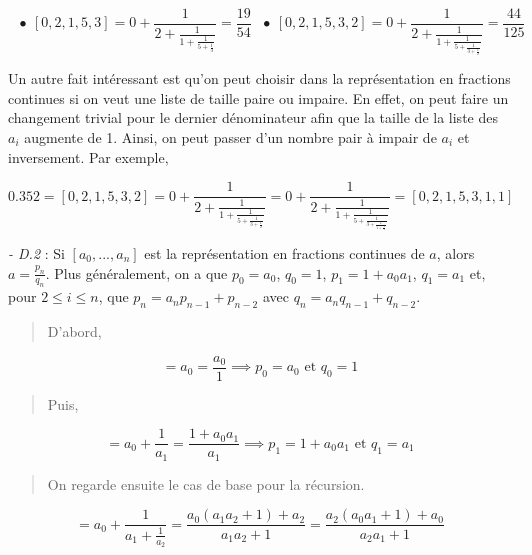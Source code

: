 \begin{equation*}
    \ \ \ \bullet \ [0,2,1,5,3] = 0 + \frac{1}{2 + \frac{1}{1 + \frac{1}{5 + \frac{1}{3}}}} = \frac{19}{54}\ \ \ \bullet \ [0,2,1,5,3,2] = 0 + \frac{1}{2 + \frac{1}{1 + \frac{1}{5 + \frac{1}{3 + \frac{1}{2}}}}} = \frac{44}{125}
\end{equation*}

Un autre fait intéressant est qu'on peut choisir dans la représentation en fractions continues si on veut une liste de taille paire ou impaire. En effet, on peut faire un changement trivial pour le dernier dénominateur afin que la taille de la liste des $a_i$ augmente de 1. Ainsi, on peut passer d'un nombre pair à impair de $a_i$ et inversement. Par exemple, 

\begin{equation*}
    0.352 = [0,2,1,5,3,2] = 0 + \frac{1}{2 + \frac{1}{1 + \frac{1}{5 + \frac{1}{3 + \frac{1}{2}}}}} = 0 + \frac{1}{2 + \frac{1}{1 + \frac{1}{5 + \frac{1}{3 + \frac{1}{1 + \frac{1}{1}}}}}} = [0,2,1,5,3,1,1]
\end{equation*}

\textit{- D.2} : Si $[a_0, ..., a_n]$ est la représentation en fractions continues de $a$, alors $a = \frac{p_n}{q_n}$. Plus généralement, on a que $p_0 = a_0$, $q_0 = 1$, $p_1 = 1 + a_0a_1$, $q_1 = a_1$ et, pour $2 \leq i \leq n$, que $p_n = a_np_{n-1} + p_{n-2}$ avec $q_n = a_nq_{n-1} + q_{n-2}$. 

\begin{quote}
    D'abord, 
\end{quote}

\begin{equation*}
    [a_0] = a_0 = \frac{a_0}{1} \implies p_0 = a_0 \text{ et } q_0 = 1
\end{equation*}

\begin{quote}
    Puis, 
\end{quote}

\begin{equation*}
    [a_0, a_1] = a_0 + \frac{1}{a_1} = \frac{1 + a_0a_1}{a_1} \implies p_1 = 1 + a_0a_1 \text{ et } q_1 = a_1    
\end{equation*}

\begin{quote}
    On regarde ensuite le cas de base pour la récursion.     
\end{quote}

\begin{equation*}
    [a_0, a_1, a_2] = a_0 + \frac{1}{a_1 + \frac{1}{a_2}} = \frac{a_0(a_1a_2 + 1) + a_2}{a_1a_2 + 1} = \frac{a_2(a_0a_1 + 1) + a_0}{a_2a_1 + 1}
\end{equation*}

